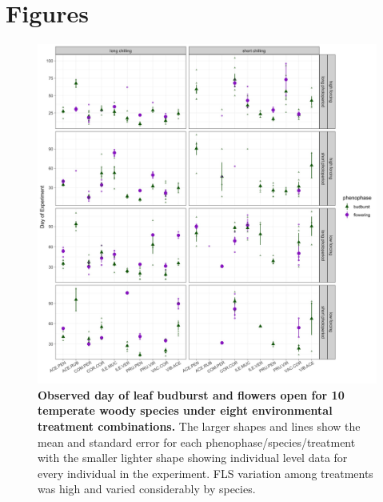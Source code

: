 \documentclass[11pt]{article}
\begin{document}
\section*{Figures}
    \begin{figure}[h!]
    \centering
 \includegraphics[width=\textwidth]{..//Plots/rawdataplots.jpg}
    \caption{\textbf{Observed day of leaf budburst and flowers open for 10 temperate woody species under eight environmental treatment combinations.} The larger shapes and lines show the mean and standard error for each phenophase/species/treatment with the smaller lighter shape showing individual level data for every individual in the experiment. FLS variation among treatments was high and varied considerably by species.}
    \label{fig:raw}
\end{figure}
\end{document}
